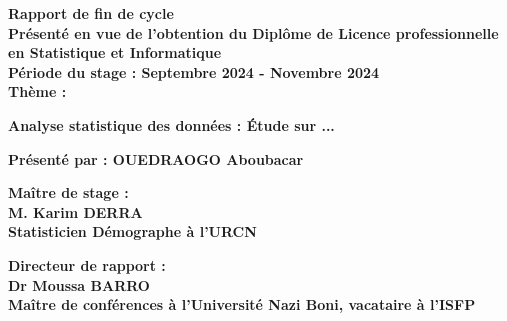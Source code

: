 \documentclass[12pt]{article}
\begin{document}
\begin{titlepage}
			\vspace{0.3cm} %
			\begin{center}
				\textcolor{black!70}{\textbf{\LARGE Rapport de fin de cycle}}\\[0.3cm]
				
				\textbf{\normalsize Présenté en vue de l'obtention du Diplôme de Licence professionnelle en Statistique et Informatique}\\[0.5cm]
				
				\textbf{\normalsize Période du stage : Septembre 2024 - Novembre 2024}\\[0.5cm]
				
				\textbf{\normalsize Thème : }\\[0.2cm]
				
				\begin{tcolorbox}[colframe=black, colback=white, sharp corners]
					\textbf{\normalsize Analyse statistique des données : Étude sur ...}
				\end{tcolorbox}
				
				\textbf{\normalsize Présenté par : OUEDRAOGO Aboubacar}\\[1cm]
				
			\end{center}
			
			
			\begin{minipage}{0.45\textwidth} %
				\raggedright
				\textbf{\small Maître de stage :}\\[0.3cm]
				\textbf{\small M. Karim DERRA}\\
				\textbf{\small Statisticien Démographe à l'URCN}
			\end{minipage}
			\hfill
			\begin{minipage}{0.45\textwidth} %
				\raggedleft
				\textbf{\small Directeur de rapport :}\\[0.3cm]
				\textbf{\small Dr Moussa BARRO}\\
				\textbf{\small Maître de conférences à l’Université Nazi Boni, vacataire à l'ISFP}
			\end{minipage}
			
			\vspace{0.4cm}
			
			\begin{center}
				\textbf{\small}
			\end{center}
			
		\end{titlepage}
	
\end{document}

